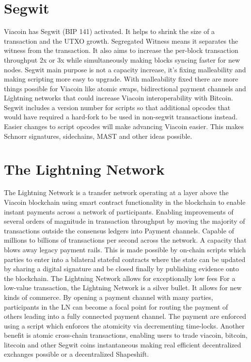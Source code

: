 \documentclass{article}
\begin{document}
\section{Segwit}\label{sec: Segwit}
Viacoin has \cite{segwit}Segwit (BIP 141) activated. It helps to shrink the size of a transaction and the UTXO growth.
Segregated Witness means it separates the witness from the transaction. It also
aims to increase the per-block transaction throughput 2x or 3x while
simultaneously making blocks syncing faster for new nodes.
\newline \newline \noindent
Segwit main purpose is not a capacity increase, it’s fixing malleability and
making scripting more easy to upgrade. With malleability fixed there are more
things possible for Viacoin like \cite{atomic}atomic swaps, bidirectional payment channels and
Lightning networks that could increase Viacoin interoperability with Bitcoin.
\newline \newline \noindent
Segwit includes a version number for scripts so that additional opcodes that would have required
a hard-fork to be used in non-segwit transactions instead. Easier changes to script opcodes will make advancing
Viacoin easier. This makes Schnorr signatures, sidechains, MAST and other ideas possible.

\section{The Lightning Network}\label{sec: The Lightning Network}
\cite{lightningNetwork}The Lightning Network is a transfer network operating at a layer above the
Viacoin blockchain using smart contract functionality in the blockchain to enable instant payments across a network of participants. 
Enabling improvements of several orders of magnitude in
transaction throughput by moving the majority of transactions outside the
consensus ledgers into Payment channels. Capable of millions to billions of transactions per second across the network.
A capacity that blows away legacy payment rails.
This is made possible by on-chain scripts which parties to enter into a bilateral stateful contracts where the state
can be updated by sharing a digital signature and be closed finally by publishing
evidence onto the blockchain.
\newline \newline \noindent
The Lightning Network allows for exceptionally low fees For a low-value transaction, the Lightning Network
is a silver bullet. It allows for new kinds of commerce.
By opening a payment channel with many parties, participants in the LN can
become a focal point for routing the payment of others leading into a fully
connected payment channel. The payment are enforced using a script which enforces the atomicity via decrementing time-locks.
\newline \newline \noindent
Another benefit is atomic cross-chain transactions, enabling users to trade viacoin, bitcoin, litecoin and other Segwit coins
instantaneous making real efficient decentralized exchanges possible or a decentralized Shapeshift.
\newpage
\end{document}
